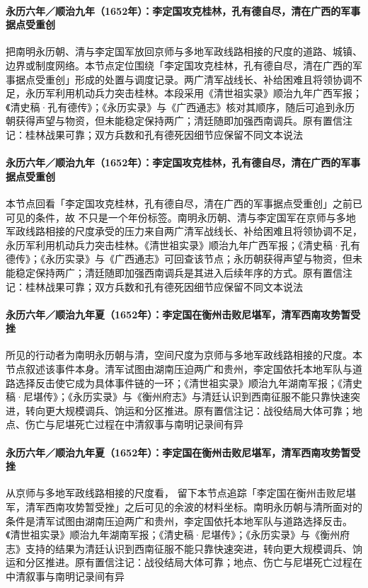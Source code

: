 \paragraph{永历六年／顺治九年（1652年）：李定国攻克桂林，孔有德自尽，清在广西的军事据点受重创}
 把南明永历朝、清与李定国军放回京师与多地军政线路相接的尺度的道路、城镇、边界或制度网络。本节点定位围绕「李定国攻克桂林，孔有德自尽，清在广西的军事据点受重创」形成的处置与调度记录。两广清军战线长、补给困难且将领协调不足，永历军利用机动兵力突击桂林。本段采用《清世祖实录》顺治九年广西军报；《清史稿·孔有德传》；《永历实录》与《广西通志》核对其顺序，随后可追到永历朝获得声望与物资，但未能稳定保持两广；清廷随即加强西南调兵。原有置信注记：桂林战果可靠；双方兵数和孔有德死因细节应保留不同文本说法

\paragraph{永历六年／顺治九年（1652年）：李定国攻克桂林，孔有德自尽，清在广西的军事据点受重创}
本节点回看「李定国攻克桂林，孔有德自尽，清在广西的军事据点受重创」之前已可见的条件，故 不只是一个年份标签。南明永历朝、清与李定国军在京师与多地军政线路相接的尺度承受的压力来自两广清军战线长、补给困难且将领协调不足，永历军利用机动兵力突击桂林。《清世祖实录》顺治九年广西军报；《清史稿·孔有德传》；《永历实录》与《广西通志》可回查该节点；永历朝获得声望与物资，但未能稳定保持两广；清廷随即加强西南调兵是其进入后续年序的方式。原有置信注记：桂林战果可靠；双方兵数和孔有德死因细节应保留不同文本说法

\paragraph{永历六年／顺治九年夏（1652年）：李定国在衡州击败尼堪军，清军西南攻势暂受挫}
 所见的行动者为南明永历朝与清，空间尺度为京师与多地军政线路相接的尺度。本节点叙述该事件本身。清军试图由湖南压迫两广和贵州，李定国依托本地军队与道路选择反击使它成为具体事件链的一环；《清世祖实录》顺治九年湖南军报；《清史稿·尼堪传》；《永历实录》与《衡州府志》与清廷认识到西南征服不能只靠快速突进，转向更大规模调兵、饷运和分区推进。原有置信注记：战役结局大体可靠；地点、伤亡与尼堪死亡过程在中清叙事与南明记录间有异

\paragraph{永历六年／顺治九年夏（1652年）：李定国在衡州击败尼堪军，清军西南攻势暂受挫}
从京师与多地军政线路相接的尺度看， 留下本节点追踪「李定国在衡州击败尼堪军，清军西南攻势暂受挫」之后可见的余波的材料坐标。南明永历朝与清所面对的条件是清军试图由湖南压迫两广和贵州，李定国依托本地军队与道路选择反击。《清世祖实录》顺治九年湖南军报；《清史稿·尼堪传》；《永历实录》与《衡州府志》支持的结果为清廷认识到西南征服不能只靠快速突进，转向更大规模调兵、饷运和分区推进。原有置信注记：战役结局大体可靠；地点、伤亡与尼堪死亡过程在中清叙事与南明记录间有异

